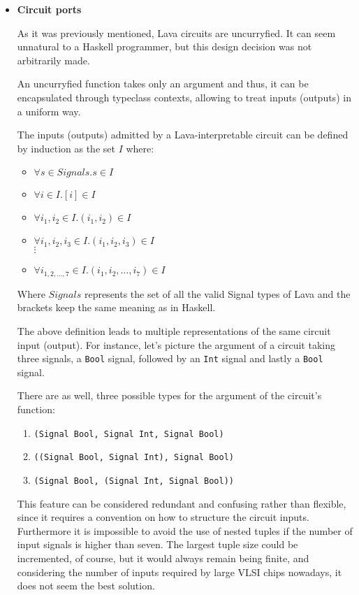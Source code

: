\begin{itemize}
  \item \textbf{Circuit ports}
    
    As it was previously mentioned, Lava circuits are uncurryfied.  It
    can seem unnatural to a Haskell programmer, but this design
    decision was not arbitrarily made. 
    
    An uncurryfied function takes only an argument and thus, it 
    can be encapsulated through typeclass contexts, allowing to treat
    inputs (outputs) in a uniform way.

    The inputs (outputs) admitted by a Lava-interpretable circuit
    can be defined by induction as the set $I$ where:
    
    \begin{itemize}
    \item $\forall s \in Signals . s  \in I$
    \item $\forall i \in I . [i] \in I$
    \item $\forall i_1,i_2 \in I . (i_1,i_2) \in I$
    \item $\forall i_1,i_2,i_3 \in I . (i_1,i_2,i_3) \in I$\\
      $\vdots$
    \item $\forall i_{1,2,\dots,7} \in I . (i_1,i_2,\dots,i_7) \in I$
    \end{itemize}
    
    Where $Signals$ represents the set of all the valid Signal types
    of Lava and the brackets keep the same meaning as in Haskell.
    
    The above definition leads to multiple representations of the same
    circuit input (output).  For instance, let's picture the argument of a
    circuit taking three signals, a \texttt{Bool} signal, followed by
    an \texttt{Int} signal and lastly a \texttt{Bool} signal.
    
    There are as well, three possible types for the argument
    of the circuit's function: 
    \begin{enumerate}[1)]
      \item \texttt{(Signal Bool, Signal Int, Signal Bool)}
      \item \texttt{((Signal Bool, Signal Int), Signal Bool)}
      \item \texttt{(Signal Bool, (Signal Int, Signal Bool))}
    \end{enumerate}
    
    

    This feature can be considered redundant and confusing rather than
    flexible, since it requires a convention on how to structure the
    circuit inputs. Furthermore it is impossible to avoid the use of
    nested tuples if the number of input signals is higher than seven.
    The largest tuple size could be incremented, of course, but it would
    always remain being finite, and considering the number of inputs
    required by large VLSI chips nowadays, it does not seem the best
    solution.
    

\end{itemize}
